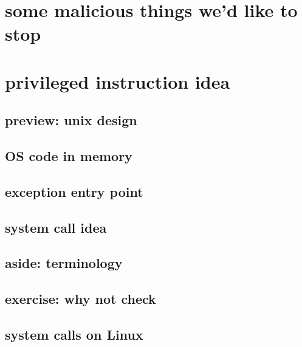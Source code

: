 \section{some malicious things we'd like to stop}



\section{privileged instruction idea}


\subsection{preview: unix design}


\subsection{OS code in memory}


\subsection{exception entry point}


\subsection{system call idea}


\subsection{aside: terminology}


\subsection{exercise: why not check}



\subsection{system calls on Linux}


